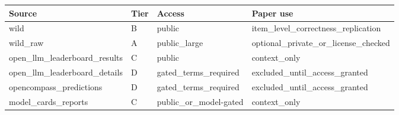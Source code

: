 \begin{tabular}{llll}
\toprule
Source & Tier & Access & Paper use \\
\midrule
wild & B & public & item\_level\_correctness\_replication \\
wild\_raw & A & public\_large & optional\_private\_or\_license\_checked \\
open\_llm\_leaderboard\_results & C & public & context\_only \\
open\_llm\_leaderboard\_details & D & gated\_terms\_required & excluded\_until\_access\_granted \\
opencompass\_predictions & D & gated\_terms\_required & excluded\_until\_access\_granted \\
model\_cards\_reports & C & public\_or\_model-gated & context\_only \\
\bottomrule
\end{tabular}
